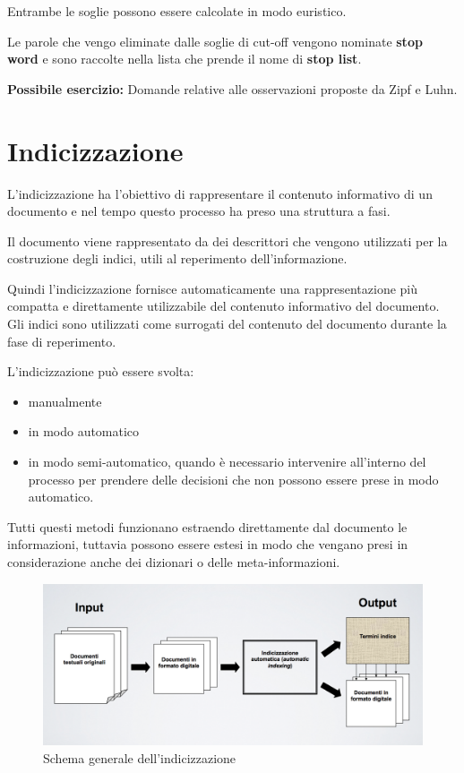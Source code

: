 \noindent Entrambe le soglie possono essere calcolate in modo euristico.

Le parole che vengo eliminate dalle soglie di cut-off vengono nominate \textbf{stop word} e sono raccolte nella lista che prende il nome di \textbf{stop list}.


\textbf{{\color{Red} Possibile esercizio:}} Domande relative alle osservazioni proposte da Zipf e Luhn.

\section{Indicizzazione}

L'indicizzazione ha l'obiettivo di rappresentare il contenuto informativo di un documento e nel tempo questo processo ha preso una struttura a fasi.

Il documento viene rappresentato da dei descrittori che vengono utilizzati per la costruzione degli indici, utili al reperimento dell'informazione.

Quindi l'indicizzazione fornisce automaticamente una rappresentazione più compatta e direttamente utilizzabile del contenuto informativo del documento. Gli indici sono utilizzati come surrogati del contenuto del documento durante la fase di reperimento.

L'indicizzazione può essere svolta:
\begin{itemize}
	\item manualmente
	\item in modo automatico
	\item in modo semi-automatico, quando è necessario intervenire all'interno del processo per prendere delle decisioni che non possono essere prese in modo automatico.
\end{itemize}

\noindent Tutti questi metodi funzionano estraendo direttamente dal documento le informazioni, tuttavia possono essere estesi in modo che vengano presi in considerazione anche dei dizionari o delle meta-informazioni.

\begin{figure}[htbp]
	\centering
	\includegraphics[width=0.7\linewidth]{images/l3-indicizzazione}
	\caption{Schema generale dell'indicizzazione}
\end{figure}

